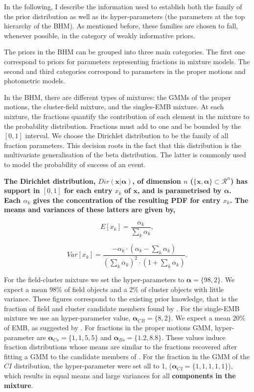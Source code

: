 In the following, I describe the information used to establish both the family of the prior distribution as well as its hyper-parameters (the parameters at the top hierarchy of the BHM). As mentioned before, these families are chosen to fall, whenever possible, in the category of weakly informative priors. 

The priors in the BHM can be grouped into three main categories. The first one correspond to priors for parameters representing fractions in mixture models. The second and third categories correspond to parameters in the proper motions and photometric models. 

In the BHM, there are different types of mixtures: the GMMs of the proper motions, the cluster-field mixture, and the singles-EMB mixture. At each mixture, the fractions quantify the contribution of each element in the mixture to the probability distribution. Fractions must add to one and be bounded by the $[0,1]$ interval.  We choose the Dirichlet distribution to be the family of all fraction parameters. This decision roots in the fact that this distribution is the multivariate generalisation of the beta distribution. The latter is commonly used to model the probability of success of an event.

\textbf{The Dirichlet distribution, $Dir(\mathbf{x}|\boldsymbol{\alpha})$, of dimension $n$ ($\{\mathbf{x},\boldsymbol{\alpha}\} \subset \mathcal{R}^n$) has support in $[0,1]$ for each entry $x_k$ of $\mathbf{x}$, and is parametrised by $\boldsymbol{\alpha}$. Each $\alpha_k$ gives the concentration of the resulting PDF for entry $x_k$. The means and variances of these latters are given by,}

\begin{equation}
E[x_k]=\frac{\alpha_k}{\sum_k \alpha_k},
\end{equation}

\begin{equation}
Var[x_k]=\frac{-\alpha_k\cdot (\alpha_k -\sum_k \alpha_k)}{(\sum_k \alpha_k)^2 \cdot (1+\sum_k \alpha_k)}.
\end{equation}

For the field-cluster mixture we set the hyper-parameters to $\boldsymbol{\alpha}=\{98,2\}$. We expect a mean 98\% of field objects and a 2\% of cluster objects with little variance. These figures correspond to the existing prior knowledge, that is the fraction of field and cluster candidate members found by \citet{Bouy2015}. 
For the single-EMB mixture we use an hyper-parameter value, $\boldsymbol{\alpha}_{CB}=\{8,2\}$. We expect a mean 20\% of EMB, as suggested by \citet{Bouy2015}. 
For fractions in the proper motions GMM, hyper-parameter are $\boldsymbol{\alpha}_{Cs}=\{1,1,5,5\}$ and $\boldsymbol{\alpha}_{Bs}=\{1.2,8.8\}$. These values induce fraction distributions whose means are similar to the fractions recovered after fitting a GMM to the  candidate members of \citet{Bouy2015}. 
For the fraction in the GMM of the $CI$ distribution, the hyper-parameter were set all to 1, ($\boldsymbol{\alpha}_{CI}=\{1,1,1,1,1\}$), which results in equal means and large variances for all \textbf{components in the mixture}. 

